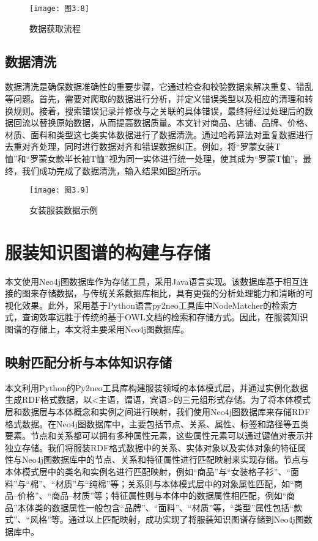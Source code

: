\documentclass[bachelor_p]{hdu-thesis}
\begin{document}
\begin{figure}[h]
  \centering
  \texttt{[image: 图3.8]}
  \caption{数据获取流程}\label{fig:graph.38}
\end{figure}

\subsection{数据清洗}

数据清洗是确保数据准确性的重要步骤，它通过检查和校验数据来解决重复、错乱等问题。首先，需要对爬取的数据进行分析，并定义错误类型以及相应的清理和转换规则。接着，搜索错误记录并修改与之关联的具体错误，最终将经过处理后的数据回流以替换原始数据，从而提高数据质量。本文针对商品、店铺、品牌、价格、材质、面料和类型这七类实体数据进行了数据清洗。通过哈希算法对重复数据进行去重对齐处理，同时进行数据对齐和错误数据纠正。例如，将“罗蒙女装T恤”和“罗蒙女款半长袖T恤”视为同一实体进行统一处理，使其成为“罗蒙T恤”。最终，我们成功完成了数据清洗，输入结果如图\ref{fig:graph.39}所示。

\begin{figure}[h]
  \centering
  \texttt{[image: 图3.9]}
  \caption{女装服装数据示例}\label{fig:graph.39}
\end{figure}

\section{服装知识图谱的构建与存储}
本文使用Neo4j图数据库作为存储工具，采用Java语言实现。该数据库基于相互连接的图来存储数据，与传统关系数据库相比，具有更强的分析处理能力和清晰的可视化效果。此外，采用基于Python语言py2neo工具库中NodeMatcher的检索方式，查询效率远胜于传统的基于OWL文档的检索和存储方式。因此，在服装知识图谱的存储上，本文将主要采用Neo4j图数据库。
\subsection{映射匹配分析与本体知识存储}
本文利用Python的Py2neo工具库构建服装领域的本体模式层，并通过实例化数据生成RDF格式数据，以<主语，谓语，宾语>的三元组形式存储。为了将本体模式层和数据层与本体概念和实例之间进行映射，我们使用Neo4j图数据库来存储RDF格式数据。在Neo4j图数据库中，主要包括节点、关系、属性、标签和路径等五类要素。节点和关系都可以拥有多种属性元素，这些属性元素可以通过键值对表示并独立存储。我们将服装RDF格式数据中的关系、实体对象以及实体对象的特征属性与Neo4j图数据库中的节点、关系和特征属性进行匹配映射来实现存储。节点与本体模式层中的类名和实例名进行匹配映射，例如“商品”与“女装格子衫”、“面料”与“棉”、“材质”与“纯棉”等；关系则与本体模式层中的对象属性匹配，如“商品--价格”、“商品--材质”等；特征属性则与本体中的数据属性相匹配，例如“商品”本体类的数据属性一般包含“品牌”、“面料”、“材质”等，“类型”属性包括“款式”、“风格”等。通过以上匹配映射，成功实现了将服装知识图谱存储到Neo4j图数据库中。
\end{document}
